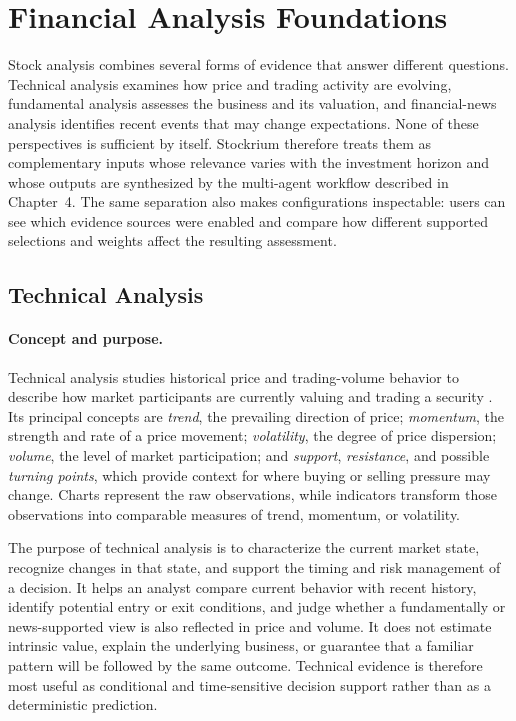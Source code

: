\section{Financial Analysis Foundations}
\label{sec:financial-analysis-foundations}

Stock analysis combines several forms of evidence that answer different questions. Technical analysis examines how price and trading activity are evolving, fundamental analysis assesses the business and its valuation, and financial-news analysis identifies recent events that may change expectations. None of these perspectives is sufficient by itself. Stockrium therefore treats them as complementary inputs whose relevance varies with the investment horizon and whose outputs are synthesized by the multi-agent workflow described in Chapter~4. The same separation also makes configurations inspectable: users can see which evidence sources were enabled and compare how different supported selections and weights affect the resulting assessment.

\subsection{Technical Analysis}
\label{subsec:technical-analysis-foundations}

\paragraph{Concept and purpose.}

Technical analysis studies historical price and trading-volume behavior to describe how market participants are currently valuing and trading a security \cite{murphy1999technical}. Its principal concepts are \textit{trend}, the prevailing direction of price; \textit{momentum}, the strength and rate of a price movement; \textit{volatility}, the degree of price dispersion; \textit{volume}, the level of market participation; and \textit{support}, \textit{resistance}, and possible \textit{turning points}, which provide context for where buying or selling pressure may change. Charts represent the raw observations, while indicators transform those observations into comparable measures of trend, momentum, or volatility.

The purpose of technical analysis is to characterize the current market state, recognize changes in that state, and support the timing and risk management of a decision. It helps an analyst compare current behavior with recent history, identify potential entry or exit conditions, and judge whether a fundamentally or news-supported view is also reflected in price and volume. It does not estimate intrinsic value, explain the underlying business, or guarantee that a familiar pattern will be followed by the same outcome. Technical evidence is therefore most useful as conditional and time-sensitive decision support rather than as a deterministic prediction.

